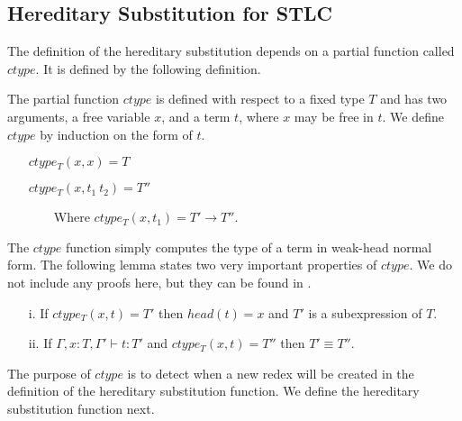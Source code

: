 \subsection{Hereditary Substitution for STLC}
\label{subsec:hereditary_substitution_for_stlc}
The definition of the hereditary substitution depends on a
partial function called $ctype$.  It is defined by the following definition.
\begin{definition}
  \label{def:ctype_stlc}
  The partial function $ctype$ is defined with respect to a fixed type $T$
  and has two arguments, a free variable $x$, and a term $t$, where $x$
  may be free in $t$.  We define $ctype$ by induction on the form of $t$.
  \begin{itemize}
  \item[] $ctype_T(x,x) = T$
  \item[] $ctype_T(x,t_1\ t_2) = T''$
  \item[] \ \ \ \ Where $ctype_T(x,t_1) = T' \to T''$.
  \end{itemize}
\end{definition}
\noindent
The $ctype$ function simply computes the type of a term in weak-head normal form.
The following lemma states two very important properties of $ctype$.  We
do not include any proofs here, but they can be found in \cite{Eades:2011}.
\begin{lemma}
  \label{lemma:ctype_props_stlc}
  \begin{itemize}
  \item[i.] If $ctype_T(x,t) = T'$ then $head(t) = x$ and $T'$ 
    is a subexpression of $T$.
    
  \item[ii.] If $\Gamma,x:T,\Gamma' \vdash t:T'$ and $ctype_T(x,t) = T''$ then
    $T' \equiv T''$.   
  \end{itemize}
\end{lemma}
\noindent
The purpose of $ctype$ is to detect when a new redex will be created in the
definition of the hereditary substitution function. We define the
hereditary substitution function next.
